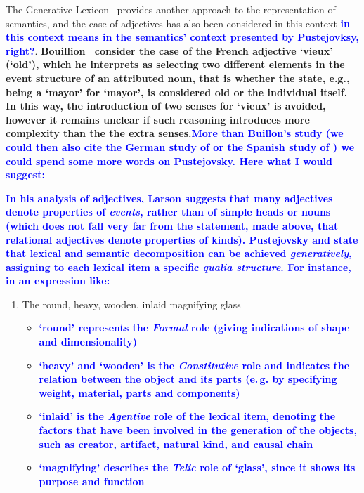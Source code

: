 \documentclass[11pt]{article}
\begin{document}
{The Generative Lexicon~\cite{pustejovsky1991generative} provides another approach to the representation of semantics, and the case of adjectives has also been considered in this context \textbf{\textcolor{blue}{in this context means in the semantics' context presented by Pustejovksy, right?}}. \textbf{Bouillion~ consider the case of the French adjective `vieux' (`old'), which he interprets as selecting two different
elements in the event structure of an attributed noun, that is whether the
state, e.g., being a `mayor' for `mayor', is considered old or the individual
itself. In this way, the introduction of two senses for `vieux' is avoided, 
however it remains unclear if such reasoning introduces more complexity than
the the extra senses.\textcolor{blue}{More than Buillon's study (we could then also cite the German study of \cite{beck2000relational} or the Spanish study of \cite{mcnally2004relational}) we could spend some more words on Pustejovsky. Here what I would suggest:}}

\textbf{\textcolor{blue}{In his analysis of adjectives, Larson  suggests that many adjectives denote properties of \textit{events}, rather than of simple heads or nouns (which does not fall very far from the statement, made above, that relational adjectives denote properties of kinds). Pustejovsky  and \cite{lenci2000qualia} state that lexical and semantic decomposition can be achieved \textit{generatively}, assigning to each lexical item a specific \textit{qualia structure}. For instance, in an expression like:}}

\begin{enumerate}[resume]
\item The round, heavy, wooden, inlaid magnifying glass \label{ex:qualia}
\begin{itemize}
\item \textbf{\textcolor{blue}{`round' represents the \textit{Formal} role (giving indications of shape and dimensionality)}}
\item \textbf{\textcolor{blue}{`heavy' and `wooden' is the \textit{Constitutive} role and indicates the relation between the object and its parts (e.\,g. by specifying weight, material, parts and components)}}
\item \textbf{\textcolor{blue}{`inlaid' is the \textit{Agentive} role of the lexical item, denoting the factors that have been involved in the generation of the objects, such as creator, artifact, natural kind, and causal chain}}
\item \textbf{\textcolor{blue}{`magnifying' describes the \textit{Telic} role of `glass', since it shows its purpose and function}}
\end{itemize}
\end{enumerate}



}
\end{document}
